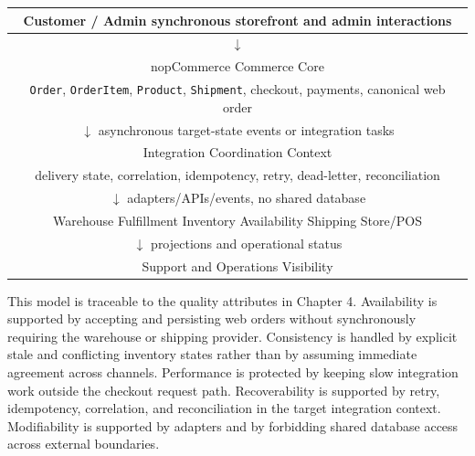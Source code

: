 \begin{center}
\begin{tabular}{c}
\hline
Customer / Admin synchronous storefront and admin interactions \\
\hline
$\downarrow$ \\
\hline
nopCommerce Commerce Core \\
\texttt{Order}, \texttt{OrderItem}, \texttt{Product}, \texttt{Shipment}, checkout, payments, canonical web order \\
\hline
$\downarrow$ asynchronous target-state events or integration tasks \\
\hline
Integration Coordination Context \\
delivery state, correlation, idempotency, retry, dead-letter, reconciliation \\
\hline
$\downarrow$ adapters/APIs/events, no shared database \\
\hline
Warehouse Fulfillment \quad Inventory Availability \quad Shipping \quad Store/POS \\
\hline
$\downarrow$ projections and operational status \\
\hline
Support and Operations Visibility \\
\hline
\end{tabular}
\end{center}

This model is traceable to the quality attributes in Chapter 4. Availability is supported by
accepting and persisting web orders without synchronously requiring the warehouse or shipping
provider. Consistency is handled by explicit stale and conflicting inventory states rather than
by assuming immediate agreement across channels. Performance is protected by keeping slow
integration work outside the checkout request path. Recoverability is supported by retry,
idempotency, correlation, and reconciliation in the target integration context. Modifiability is
supported by adapters and by forbidding shared database access across external boundaries.

